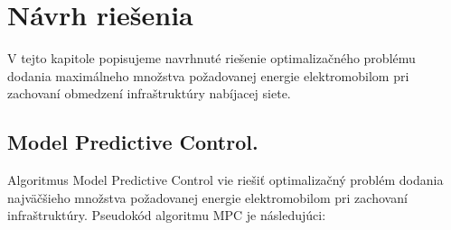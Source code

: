 

% 


\chapter{Návrh riešenia}
V tejto kapitole popisujeme navrhnuté riešenie optimalizačného problému dodania maximálneho množstva požadovanej energie elektromobilom pri zachovaní obmedzení infraštruktúry nabíjacej siete.








\section{Model Predictive Control.}

Algoritmus Model Predictive Control vie riešiť optimalizačný problém dodania najväčšieho množstva požadovanej energie elektromobilom pri zachovaní infraštruktúry. Pseudokód algoritmu MPC je následujúci:

